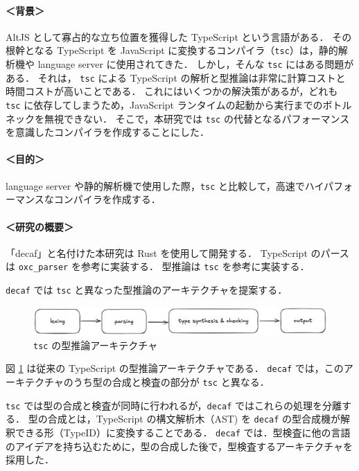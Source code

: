 \documentclass[dvipdfmx]{classes/tyukan}
\begin{document}
\paragraph{＜背景＞}
AltJS として寡占的な立ち位置を獲得した TypeScript という言語がある．
その根幹となる TypeScript を JavaScript に変換するコンパイラ（\texttt{tsc}）は，静的解析機や
language server に使用されてきた．
しかし，そんな \texttt{tsc} にはある問題がある．
それは， \texttt{tsc} による TypeScript の解析と型推論は非常に計算コストと時間コストが高いことである．
これにはいくつかの解決策があるが，どれも \texttt{tsc} に依存してしまうため，JavaScript
ランタイムの起動から実行までのボトルネックを無視できない．
そこで，本研究では \texttt{tsc} の代替となるパフォーマンスを意識したコンパイラを作成することにした．

\paragraph{＜目的＞}
language server や静的解析機で使用した際，\texttt{tsc} と比較して，高速でハイパフォーマンスなコンパイラを作成する．

\paragraph{＜研究の概要＞}
「decaf」と名付けた本研究は Rust を使用して開発する．
TypeScript のパースは \texttt{oxc\_parser} を参考に実装する．
型推論は \texttt{tsc} を参考に実装する．

\texttt{decaf} では \texttt{tsc} と異なった型推論のアーキテクチャを提案する．

\begin{figure}[h]
  \centering
  \includegraphics[width=0.9\columnwidth]{figures/type_check_arch.png}
  \caption{\texttt{tsc} の型推論アーキテクチャ}
  \label{fig:type_check_arch}
\end{figure}

図 \ref{fig:type_check_arch} は従来の TypeScript の型推論アーキテクチャである．
\texttt{decaf} では，このアーキテクチャのうち型の合成と検査の部分が \texttt{tsc} と異なる．

\texttt{tsc} では型の合成と検査が同時に行われるが，\texttt{decaf} ではこれらの処理を分離する．
型の合成とは，TypeScript の構文解析木（AST) を \texttt{decaf} の型合成機が解釈できる形（TypeID）に変換することである．
\texttt{decaf} では．型検査に他の言語のアイデアを持ち込むために，型の合成した後で，型検査するアーキテクチャを採用した．
\end{document}
